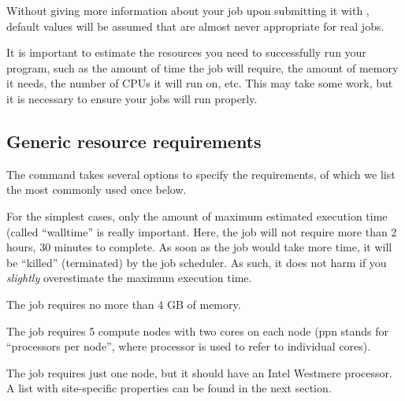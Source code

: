 Without giving more information about your job upon submitting it with
, default values will be assumed that are almost never appropriate
for real jobs.

It is important to estimate the resources you need to successfully run your
program, such as the amount of time the job will require, the amount of memory
it needs, the number of CPUs it will run on, etc. This may take some work, but
it is necessary to ensure your jobs will run properly.

\subsection{Generic resource requirements}

The  command takes several options to specify the requirements, of which we
list the most commonly used once below. \\

\begin{prompt}
\end{prompt}

For the simplest cases, only the amount of maximum estimated execution time
(called ``walltime'' is really important. Here, the job will not require more
than 2 hours, 30 minutes to complete. As soon as the job would take more time,
it will be ``killed'' (terminated) by the job scheduler.  As such, it does not
harm if you \emph{slightly} overestimate the maximum execution time. \\

\begin{prompt}
\end{prompt}

The job requires no more than 4 GB of memory. \\

\begin{prompt}
\end{prompt}

The job requires 5 compute nodes with two cores on each node (ppn stands for
``processors per node'', where processor is used to refer to individual cores). \\

\begin{prompt}
\end{prompt}

The job requires just one node, but it should have an Intel Westmere processor.
A list with site-specific properties can be found in the next section.

